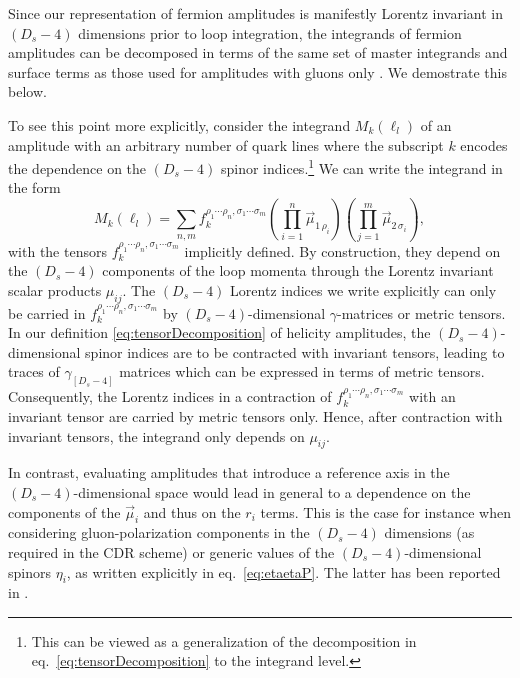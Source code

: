Since our representation of fermion amplitudes is manifestly
Lorentz invariant in $(D_s-4)$ dimensions prior to loop
integration, the integrands of fermion amplitudes can be
decomposed in terms of the same set of master integrands and
surface terms as those used for amplitudes with gluons only \cite{Abreu:2017xsl,Abreu:2017hqn}.
We demostrate this below.

 To see this point more
explicitly, consider the
integrand $M_k(\ell_l)$
of an amplitude with an arbitrary
number of quark lines where the subscript $k$ encodes the
dependence on the $(D_s-4)$ spinor 
indices.\footnote{This can be viewed as a generalization of the
decomposition in eq.~\eqref{eq:tensorDecomposition} to the
integrand level.} We can write the integrand in the form
\begin{equation}
  M_k(\ell_l) = \sum_{n,m} f^{\rho_1 \cdots \rho_n, \sigma_1
  \cdots \sigma_m}_{k}
  \left(\prod_{i=1}^n \vec{\mu}_{1 \, \rho_i}\right)
  \left(\prod_{j=1}^m \vec{\mu}_{2 \, \sigma_i}\right),
\end{equation}
with the tensors $f^{\rho_1 \cdots \rho_n, \sigma_1\cdots \sigma_m}_{k}$ implicitly defined. By construction, they
depend on the $(D_s-4)$ components of the loop momenta through
the Lorentz invariant scalar products $\mu_{ij}$. The
$(D_s-4)$ Lorentz indices we write explicitly can only be 
carried in $f^{\rho_1 \cdots \rho_n, \sigma_1\cdots \sigma_m}_{k}$ by $(D_s-4)$-dimensional $\gamma$-matrices or
metric tensors.
In our definition \eqref{eq:tensorDecomposition} of helicity 
amplitudes, the $(D_s-4)$-dimensional spinor indices are to be
contracted with invariant tensors, leading to traces of
$\gamma_{[D_s-4]}$ matrices which
can be expressed in terms of metric tensors. Consequently, the
Lorentz indices in a contraction of $f^{\rho_1 \cdots \rho_n, \sigma_1\cdots \sigma_m}_{k}$ with an invariant tensor
are carried by metric tensors only.
Hence, after contraction with invariant tensors, 
the integrand only depends on $\mu_{ij}$.

In contrast, evaluating amplitudes that introduce a reference
axis in the $(D_s-4)$-dimensional space
would lead in general to a dependence on the components of the
$\vec\mu_i$ and thus on the $r_i$ terms. 
This is the case for instance when considering
gluon-polarization components in the $(D_s-4)$ dimensions 
(as required in the CDR scheme) or generic values of the 
$(D_s-4)$-dimensional spinors $\eta_i$, as written explicitly in eq.~\eqref{eq:etaetaP}. 
The latter has been reported in \cite{Fazio:2014xea,Badger:2017gta}.



